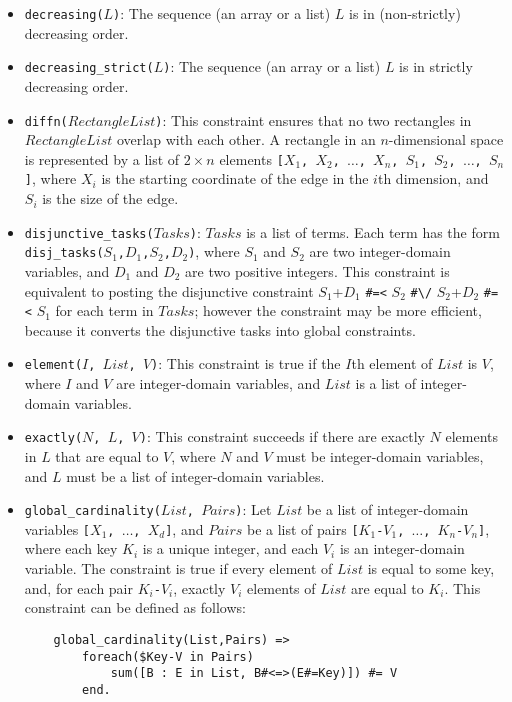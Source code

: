 \begin{itemize}
\item \texttt{decreasing($L$)}: The sequence (an array or a list) $L$ is in (non-strictly) decreasing order.

\item \texttt{decreasing\_strict($L$)}: The sequence (an array or a list) $L$ is in strictly decreasing order.

\item \texttt{diffn($RectangleList$)}: This constraint ensures that no two rectangles in $RectangleList$ overlap with each other. A rectangle in an $n$-dimensional space is represented by a list of $2\times n$ elements \texttt{[$X_1$, $X_2$, $\ldots$, $X_n$, $S_1$, $S_2$, $\ldots$, $S_n$]}, where \texttt{$X_i$} is the starting coordinate of the edge in the $i$th dimension, and \texttt{$S_i$} is the size of the edge.

\item \texttt{disjunctive\_tasks($Tasks$)}: $Tasks$ is a list of terms.  Each term has the form \\ \texttt{disj\_tasks($S_1$,$D_1$,$S_2$,$D_2$)}, where \texttt{$S_1$} and \texttt{$S_2$} are two integer-domain variables, and \texttt{$D_1$} and \texttt{$D_2$} are two positive integers. This constraint is equivalent to posting the disjunctive constraint $S_1$+$D_1$ \verb+#=<+ $S_2$ \verb+#\/+ $S_2$+$D_2$ \verb+#=<+ $S_1$ for each term in $Tasks$; however the constraint may be more efficient, because it converts the disjunctive tasks into global constraints. 

\item \texttt{element($I$, $List$, $V$)}: This constraint is true if the $I$th element of $List$ is $V$, where $I$ and $V$ are integer-domain variables, and $List$ is a list of integer-domain variables.

\item \texttt{exactly($N$, $L$, $V$)}: This constraint succeeds if there are exactly $N$ elements in $L$ that are equal to $V$, where $N$ and $V$ must be integer-domain variables, and $L$ must be a list of integer-domain variables.

\item \texttt{global\_cardinality($List$, $Pairs$)}: Let $List$ be a list of integer-domain variables \texttt{[$X_1$, $\ldots$, $X_d$]}, and $Pairs$ be a list of pairs \texttt{[$K_1$-$V_1$, $\ldots$, $K_n$-$V_n$]}, where each key \texttt{$K_i$} is a unique integer, and each \texttt{$V_i$} is an integer-domain variable. The constraint is true if every element of $List$ is equal to some key, and, for each pair \texttt{$K_i$-$V_i$}, exactly \texttt{$V_i$} elements of $List$ are equal to \texttt{$K_i$}. This constraint can be defined as follows:
\begin{verbatim}
    global_cardinality(List,Pairs) =>
        foreach($Key-V in Pairs) 
            sum([B : E in List, B#<=>(E#=Key)]) #= V
        end.
\end{verbatim}


\end{itemize}
